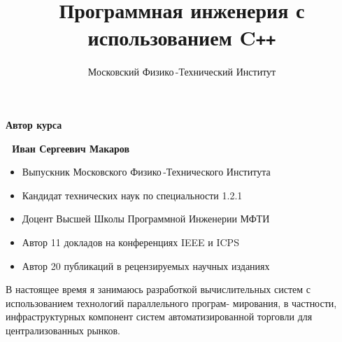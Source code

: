 \documentclass{beamer} %
\title{Программная инженерия с использованием C\texttt{++}} %
\author{Московский Физико\,-Технический Институт} %
\date{}
\begin{document}
\frame{\titlepage} %

\begin{frame}{\bf Автор курса}

    \textbf{\;\;\;\;\,\,\,\,Иван Сергеевич Макаров}

    \bigskip
    
    \begin{itemize}

        \item Выпускник Московского Физико\,-Технического Института

        \item Кандидат технических наук по специальности 1.2.1

        \item Доцент Высшей Школы Программной Инженерии МФТИ
    
        \item Автор 11 докладов на конференциях IEEE и ICPS

        \item Автор 20 публикаций в рецензируемых научных изданиях
        
    \end{itemize}

    \begin{block}
    \justifying В настоящее время я занимаюсь разработкой вычислительных систем с использованием технологий параллельного програм- мирования, в частности, инфраструктурных компонент систем автоматизированной торговли для централизованных рынков.
    \end{block}
    
\end{frame}
\end{document}
